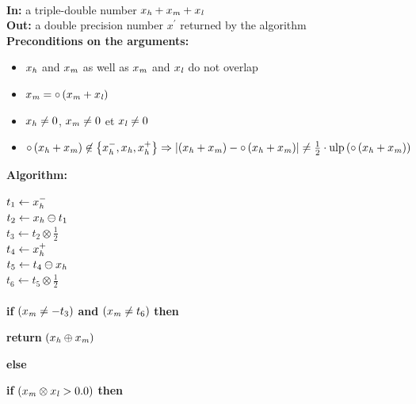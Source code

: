 \begin{algorithm} \label{algarrpres} ~ \\
{\bf In:} a triple-double number $x_{\mathit{h}} + x_{\mathit{m}} + x_{\mathit{l}}$ \\
{\bf Out:} a double precision number $x^\prime$ returned by the algorithm \\
{\bf Preconditions on the arguments:}
\begin{itemize}
\item $x_{\mathit{h}}$ and $x_{\mathit{m}}$ as well as $x_{\mathit{m}}$ and $x_{\mathit{l}}$ do not overlap
\item $x_{\mathit{m}} = \circ \left( x_{\mathit{m}} + x_{\mathit{l}} \right)$
\item $x_{\mathit{h}} \not = 0$, $x_{\mathit{m}} \not = 0$ et $x_{\mathit{l}} \not = 0$  
\item $\circ \left( x_{\mathit{h}} + x_{\mathit{m}} \right) \not \in \left \lbrace x_{\mathit{h}}^-, x_{\mathit{h}}, x_{\mathit{h}}^+ \right \rbrace \Rightarrow 
\left \vert \left( x_{\mathit{h}} + x_{\mathit{m}} \right) - \circ\left( x_{\mathit{h}} + x_{\mathit{m}} \right) \right \vert \not = 
\frac{1}{2} \cdot \mathrm{ulp}\left( \circ \left( x_{\mathit{h}} + x_{\mathit{m}} \right) \right)$
\end{itemize}
{\bf Algorithm:} \\
\begin{center}
\begin{minipage}[b]{80mm}
$t_1 \gets x_{\mathit{h}}^-$ \\
$t_2 \gets x_{\mathit{h}} \ominus t_1$ \\
$t_3 \gets t_2 \otimes \frac{1}{2}$ \\
$t_4 \gets x_{\mathit{h}}^+$ \\
$t_5 \gets t_4 \ominus x_{\mathit{h}}$ \\
$t_6 \gets t_5 \otimes \frac{1}{2}$ 
\\ ~ \\
{\bf if} $\left( x_{\mathit{m}} \not = -t_3 \right)$ {\bf and} $\left( x_{\mathit{m}} \not = t_6 \right)$ {\bf then} 
\vspace{-2.4mm}
\begin{center}
\begin{minipage}[b]{70mm}
\vspace{-2.4mm}
{\bf return } $\left( x_{\mathit{h}} \oplus x_{\mathit{m}} \right)$
\end{minipage}
\end{center}
\vspace{-2.4mm}
{\bf else} 
\vspace{-2.4mm}
\begin{center}
\begin{minipage}[b]{70mm}
{\bf if} $\left( x_{\mathit{m}} \otimes x_{\mathit{l}} > 0.0 \right)$ {\bf then} 

\end{minipage}
\end{center}
\end{minipage}
\end{center}
\end{algorithm}
